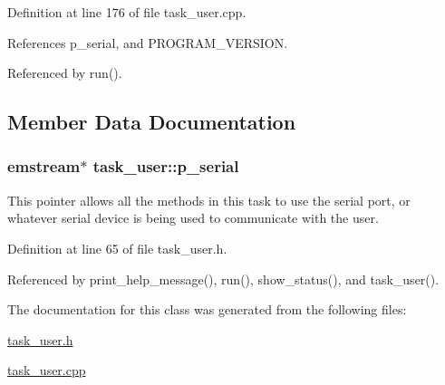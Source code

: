 Definition at line 176 of file task\+\_\+user.\+cpp.



References p\+\_\+serial, and P\+R\+O\+G\+R\+A\+M\+\_\+\+V\+E\+R\+S\+I\+O\+N.



Referenced by run().



\subsection{Member Data Documentation}
\hypertarget{classtask__user_a04ed5c2b4d7c9a1530bde6f217e01681}{
\subsubsection[{p\+\_\+serial}]{\setlength{\rightskip}{0pt plus 5cm}emstream$\ast$ task\+\_\+user\+::p\+\_\+serial\hspace{0.3cm}{\ttfamily [protected]}}}\label{classtask__user_a04ed5c2b4d7c9a1530bde6f217e01681}
This pointer allows all the methods in this task to use the serial port, or whatever serial device is being used to communicate with the user. 

Definition at line 65 of file task\+\_\+user.\+h.



Referenced by print\+\_\+help\+\_\+message(), run(), show\+\_\+status(), and task\+\_\+user().



The documentation for this class was generated from the following files\+:\begin{DoxyCompactItemize}
\item 
\hyperlink{task__user_8h}{task\+\_\+user.\+h}\item 
\hyperlink{task__user_8cpp}{task\+\_\+user.\+cpp}\end{DoxyCompactItemize}
